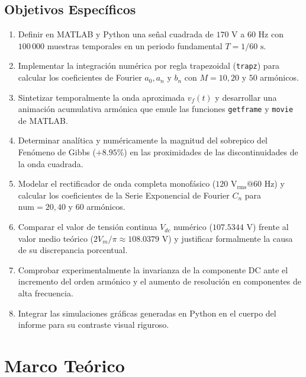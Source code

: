 \documentclass[11pt,a4paper]{article}
\begin{document}
\subsection{Objetivos Específicos}
\begin{enumerate}[leftmargin=*]
    \item Definir en MATLAB y Python una señal cuadrada de $170\text{ V}$ a $60\text{ Hz}$ con $100\,000$ muestras temporales en un periodo fundamental $T = 1/60\text{ s}$.
    \item Implementar la integración numérica por regla trapezoidal (\texttt{trapz}) para calcular los coeficientes de Fourier $a_0, a_n \text{ y } b_n$ con $M = 10, 20 \text{ y } 50$ armónicos.
    \item Sintetizar temporalmente la onda aproximada $v_f(t)$ y desarrollar una animación acumulativa armónica que emule las funciones \texttt{getframe} y \texttt{movie} de MATLAB.
    \item Determinar analítica y numéricamente la magnitud del sobrepico del Fenómeno de Gibbs ($+8.95\%$) en las proximidades de las discontinuidades de la onda cuadrada.
    \item Modelar el rectificador de onda completa monofásico ($120\text{ V}_{\text{rms}} @ 60\text{ Hz}$) y calcular los coeficientes de la Serie Exponencial de Fourier $C_n$ para $\text{num} = 20, 40 \text{ y } 60$ armónicos.
    \item Comparar el valor de tensión continua $V_{dc}$ numérico ($107.5344\text{ V}$) frente al valor medio teórico ($2V_m/\pi \approx 108.0379\text{ V}$) y justificar formalmente la causa de su discrepancia porcentual.
    \item Comprobar experimentalmente la invarianza de la componente DC ante el incremento del orden armónico y el aumento de resolución en componentes de alta frecuencia.
    \item Integrar las simulaciones gráficas generadas en Python en el cuerpo del informe para su contraste visual riguroso.
\end{enumerate}

\section{Marco Teórico}
\end{document}
